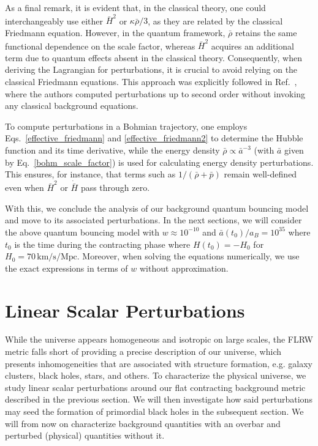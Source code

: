 \documentclass[a4paper,11pt]{article}
\begin{document}
	{
		\color{red} As a final remark, it is evident that, in the classical theory, one
		could interchangeably use either $\bar{H}^2$ or $\kappa \bar{\rho}/3$, as they are
		related by the classical Friedmann equation. However, in the quantum framework,
		$\bar{\rho}$ retains the same functional dependence on the scale factor, whereas
		$\bar{H}^2$ acquires an additional term due to quantum effects absent in the
		classical theory. Consequently, when deriving the Lagrangian for perturbations, it
		is crucial to avoid relying on the classical Friedmann equations. This approach was
		explicitly followed in Ref.~\cite{fluidgeral}, where the authors computed
		perturbations up to second order without invoking any classical background
		equations.

		To compute perturbations in a Bohmian trajectory, one employs
		Eqs.~\eqref{effective_friedmann} and \eqref{effective_friedmann2} to determine the
		Hubble function and its time derivative, while the energy density $\bar{\rho}
			\propto \bar{a}^{-3}$ (with $\bar{a}$ given by Eq.~\eqref{bohm_scale_factor}) is
		used for calculating energy density perturbations. This ensures, for instance, that
		terms such as $1/(\bar{\rho} + \bar{p})$ remain well-defined even when $\bar{H}^2$
		or $\dot{\bar{H}}$ pass through zero.
	}

With this, we conclude the analysis of our background quantum bouncing model and move to
its associated perturbations. In the next sections, we will consider the above quantum
bouncing model with $w\approx 10^{-10}$ and $\bar{a}(t_0)/a_B = 10^{35}$ where $t_0$ is
the time during the contracting phase where $H(t_0) = -H_0$ for $H_0 = 70 \,
	\text{km/s/Mpc}$. Moreover, when solving the equations numerically, we use the exact
expressions in terms of $w$ without approximation.



\section{Linear Scalar Perturbations}
\label{linearpert}

While the universe appears homogeneous and isotropic on large scales, the FLRW metric
falls short of providing a precise description of our universe, which presents
inhomogeneities that are associated with structure formation, e.g. galaxy clusters,
black holes, stars, and others. To characterize the physical universe, we study linear
scalar perturbations around our flat contracting background metric described in the
previous section. We will then investigate how said perturbations may seed the formation
of primordial black holes in the subsequent section. We will from now on characterize
background quantities with an overbar and perturbed (physical) quantities without it.
\end{document}
